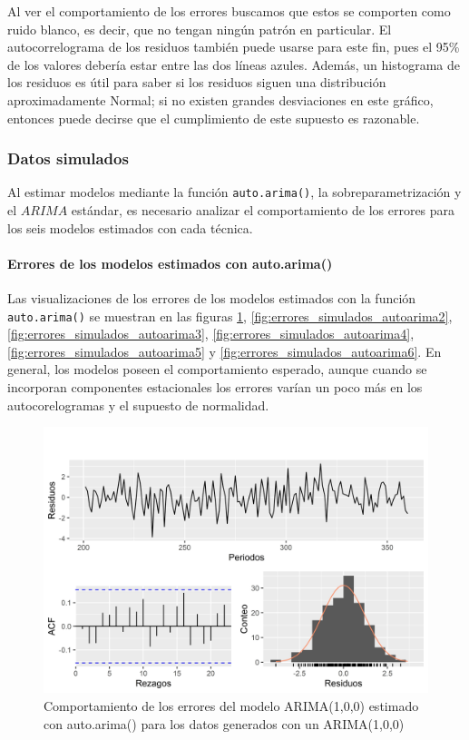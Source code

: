 \documentclass[
]{article}
\begin{document}
Al ver el comportamiento de los errores buscamos que estos se comporten
como ruido blanco, es decir, que no tengan ningún patrón en particular.
El autocorrelograma de los residuos también puede usarse para este fin,
pues el 95\% de los valores debería estar entre las dos líneas azules.
Además, un histograma de los residuos es útil para saber si los residuos
siguen una distribución aproximadamente Normal; si no existen grandes
desviaciones en este gráfico, entonces puede decirse que el cumplimiento
de este supuesto es razonable.

\subsubsection{Datos simulados}

Al estimar modelos mediante la función \texttt{auto.arima()}, la
sobreparametrización y el \(ARIMA\) estándar, es necesario analizar el
comportamiento de los errores para los seis modelos estimados con cada
técnica.

\paragraph{Errores de los modelos estimados con auto.arima()}

Las visualizaciones de los errores de los modelos estimados con la
función \texttt{auto.arima()} se muestran en las figuras
\ref{fig:errores_simulados_autoarima1},
\ref{fig:errores_simulados_autoarima2},
\ref{fig:errores_simulados_autoarima3},
\ref{fig:errores_simulados_autoarima4},
\ref{fig:errores_simulados_autoarima5} y
\ref{fig:errores_simulados_autoarima6}. En general, los modelos poseen
el comportamiento esperado, aunque cuando se incorporan componentes
estacionales los errores varían un poco más en los autocorelogramas y el
supuesto de normalidad.

\begin{figure}[H]
\includegraphics[width=1\linewidth,height=1\textheight]{Tesis_files/figure-latex/errores_simulados_autoarima1-1} \caption{Comportamiento de los errores del modelo ARIMA(1,0,0) estimado con auto.arima() para los datos generados con un ARIMA(1,0,0)}\label{fig:errores_simulados_autoarima1}
\end{figure}
\end{document}
